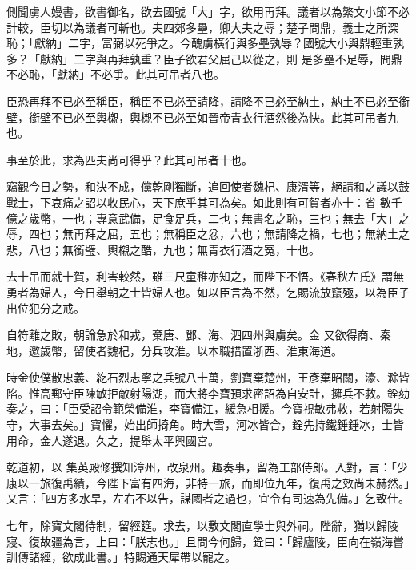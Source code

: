 \begin{pinyinscope}
 側聞虜人嫚書，欲書御名，欲去國號「大」字，欲用再拜。議者以為繁文小節不必計較，臣切以為議者可斬也。夫四郊多壘，卿大夫之辱；楚子問鼎，義士之所深恥；「獻納」二字，富弼以死爭之。今醜虜橫行與多壘孰辱？國號大小與鼎輕重孰多？「獻納」二字與再拜孰重？臣子欲君父屈己以從之，則
 是多壘不足辱，問鼎不必恥，「獻納」不必爭。此其可吊者八也。



 臣恐再拜不已必至稱臣，稱臣不已必至請降，請降不已必至納土，納土不已必至銜壁，銜壁不已必至輿櫬，輿櫬不已必至如晉帝青衣行酒然後為快。此其可吊者九也。



 事至於此，求為匹夫尚可得乎？此其可吊者十也。



 竊觀今日之勢，和決不成，儻乾剛獨斷，追回使者魏杞、康湑等，絕請和之議以鼓戰士，下哀痛之詔以收民心，天下庶乎其可為矣。如此則有可賀者亦十：省
 數千億之歲幣，一也；專意武備，足食足兵，二也；無書名之恥，三也；無去「大」之辱，四也；無再拜之屈，五也；無稱臣之忿，六也；無請降之禍，七也；無納土之悲，八也；無銜璧、輿櫬之酷，九也；無青衣行酒之冤，十也。



 去十吊而就十賀，利害較然，雖三尺童稚亦知之，而陛下不悟。《春秋左氏》謂無勇者為婦人，今日舉朝之士皆婦人也。如以臣言為不然，乞賜流放竄殛，以為臣子出位犯分之戒。



 自符離之敗，朝論急於和戎，棄唐、鄧、海、泗四州與虜矣。金
 又欲得商、秦地，邀歲幣，留使者魏杞，分兵攻淮。以本職措置浙西、淮東海道。



 時金使僕散忠義、紇石烈志寧之兵號八十萬，劉寶棄楚州，王彥棄昭關，濠、滁皆陷。惟高郵守臣陳敏拒敵射陽湖，而大將李寶預求密詔為自安計，擁兵不救。銓劾奏之，曰：「臣受詔令範榮備淮，李寶備江，緩急相援。今寶視敏弗救，若射陽失守，大事去矣。」寶懼，始出師掎角。時大雪，河冰皆合，銓先持鐵錘錘冰，士皆用命，金人遂退。久之，提舉太平興國宮。



 乾道初，以
 集英殿修撰知漳州，改泉州。趣奏事，留為工部侍郎。入對，言：「少康以一旅復禹績，今陛下富有四海，非特一旅，而即位九年，復禹之效尚未赫然。」又言：「四方多水旱，左右不以告，謀國者之過也，宜令有司速為先備。」乞致仕。



 七年，除寶文閣待制，留經筵。求去，以敷文閣直學士與外祠。陛辭，猶以歸陵寢、復故疆為言，上曰：「朕志也。」且問今何歸，銓曰：「歸廬陵，臣向在嶺海嘗訓傳諸經，欲成此書。」特賜通天犀帶以寵之。




\end{pinyinscope}
